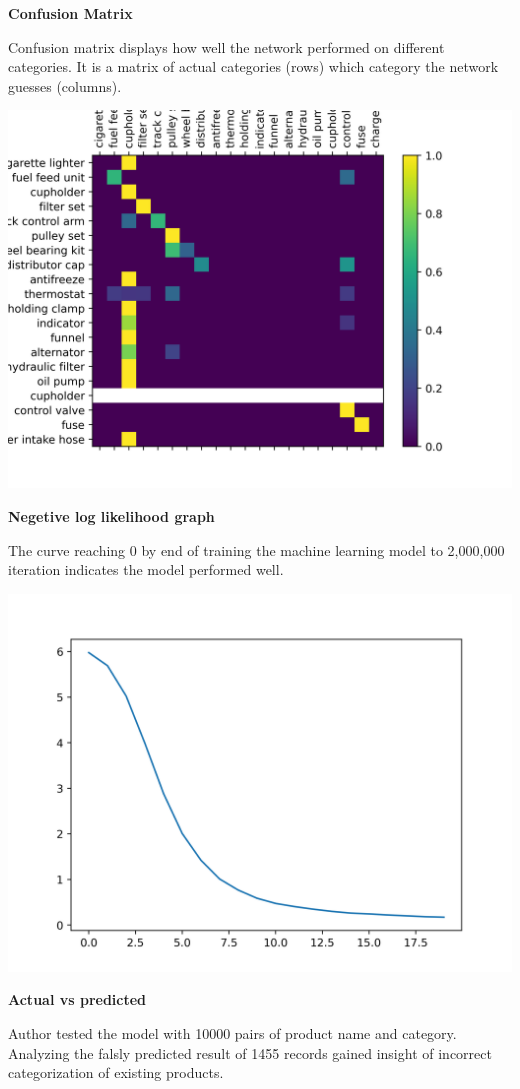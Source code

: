 \documentclass{article}
\renewcommand{\subsection}[1]{
        {\textbf{#1}}

}
\newenvironment{Figure}
  {\par\medskip\noindent\minipage{\linewidth}}
  {\endminipage\par\medskip}
\begin{document}
\begin{multicols*}{3}
\begin{center}
    \end{center}
\columnbreak
    \subsection{Confusion Matrix}
    Confusion matrix displays how well the network performed on different categories. It is a matrix of actual categories (rows) which category the network guesses (columns).

    \begin{Figure}
        \centering
        \includegraphics[width=0.50\linewidth]{confusion._200epoch}
        \captionsetup{font=footnotesize}
      
        \label{fig:cm}
    \end{Figure}


    \subsection{Negetive log likelihood graph}
    The curve reaching 0 by end of training the machine learning model to 2,000,000 iteration indicates the model performed well.

    \begin{Figure}
        \centering
        \includegraphics[width=0.50\linewidth]{loss}
        \captionsetup{font=footnotesize}
        
        \label{fig:loss}
    \end{Figure}

    \subsection{Actual vs predicted }
    Author tested the model with 10000 pairs of product name and category.
    Analyzing the falsly predicted result of 1455 records gained insight of incorrect categorization of existing products.
\vspace{0.5cm}


\end{multicols*}
\end{document}
